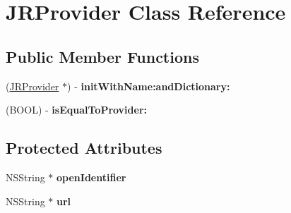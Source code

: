 \hypertarget{interface_j_r_provider}{
\section{JRProvider Class Reference}
\label{interface_j_r_provider}
}
\subsection*{Public Member Functions}
\begin{DoxyCompactItemize}
\item 
\hypertarget{interface_j_r_provider_a2e2e99f629be0597a33f0e6c2b18a91b}{
(\hyperlink{interface_j_r_provider}{JRProvider} $\ast$) -\/ {\bfseries initWithName:andDictionary:}}
\label{interface_j_r_provider_a2e2e99f629be0597a33f0e6c2b18a91b}

\item 
\hypertarget{interface_j_r_provider_a565a4183caa5318d15051a3cfc5cc742}{
(BOOL) -\/ {\bfseries isEqualToProvider:}}
\label{interface_j_r_provider_a565a4183caa5318d15051a3cfc5cc742}

\end{DoxyCompactItemize}
\subsection*{Protected Attributes}
\begin{DoxyCompactItemize}
\item 
\hypertarget{interface_j_r_provider_aecd6d9db9a84f81408042dedff3802ef}{
NSString $\ast$ {\bfseries openIdentifier}}
\label{interface_j_r_provider_aecd6d9db9a84f81408042dedff3802ef}

\item 
\hypertarget{interface_j_r_provider_a13f646dbc1ed54d0d50e09a479f98d49}{
NSString $\ast$ {\bfseries url}}
\label{interface_j_r_provider_a13f646dbc1ed54d0d50e09a479f98d49}

\end{DoxyCompactItemize}
